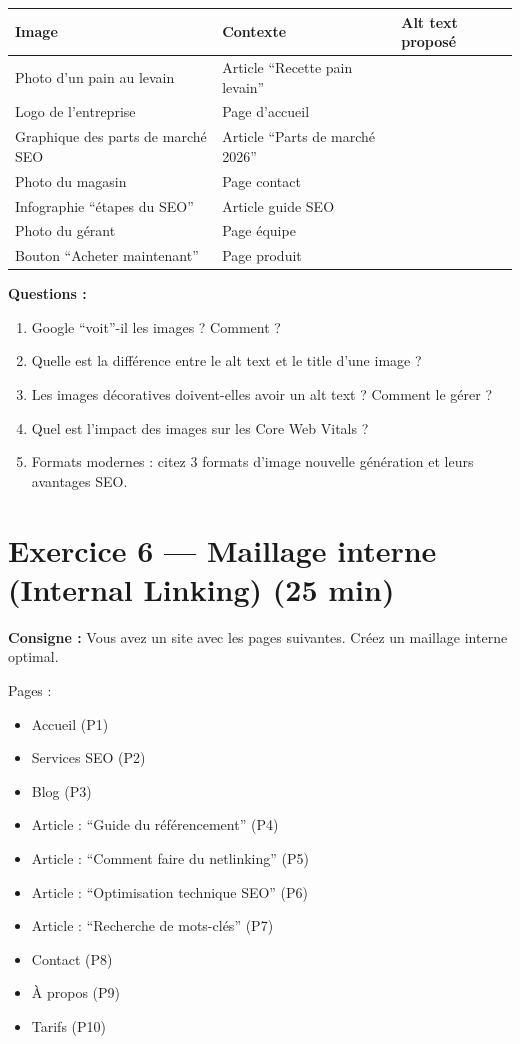 \documentclass[12pt,a4paper]{report}
\begin{document}
\begin{longtable}{lll}
\toprule
Image & Contexte & Alt text propos\'{e} \\
\midrule
\endhead
\bottomrule
\endfoot
Photo d'un pain au levain & Article ``Recette pain levain'' & \\
Logo de l'entreprise & Page d'accueil & \\
Graphique des parts de march\'{e} SEO & Article ``Parts de march\'{e} 2026'' & \\
Photo du magasin & Page contact & \\
Infographie ``\'{e}tapes du SEO'' & Article guide SEO & \\
Photo du g\'{e}rant & Page \'{e}quipe & \\
Bouton ``Acheter maintenant'' & Page produit & \\
\bottomrule
\end{longtable}

\textbf{Questions :}
\begin{enumerate}
    \item Google ``voit''-il les images ? Comment ?
    \item Quelle est la diff\'{e}rence entre le alt text et le title d'une image ?
    \item Les images d\'{e}coratives doivent-elles avoir un alt text ? Comment le g\'{e}rer ?
    \item Quel est l'impact des images sur les Core Web Vitals ?
    \item Formats modernes : citez 3 formats d'image nouvelle g\'{e}n\'{e}ration et leurs avantages SEO.
\end{enumerate}

\section{Exercice 6 --- Maillage interne (Internal Linking) (25 min)}

\textbf{Consigne :} Vous avez un site avec les pages suivantes. Cr\'{e}ez un maillage interne optimal.

Pages :
\begin{itemize}
    \item Accueil (P1)
    \item Services SEO (P2)
    \item Blog (P3)
    \item Article : ``Guide du r\'{e}f\'{e}rencement'' (P4)
    \item Article : ``Comment faire du netlinking'' (P5)
    \item Article : ``Optimisation technique SEO'' (P6)
    \item Article : ``Recherche de mots-cl\'{e}s'' (P7)
    \item Contact (P8)
    \item \`{A} propos (P9)
    \item Tarifs (P10)
\end{itemize}
\end{document}
